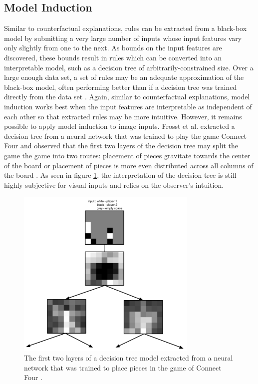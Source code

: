 \subsection{Model Induction}

Similar to counterfactual explanations, rules can be extracted from a black-box model by submitting a very large number of inputs whose input features vary only slightly from one to the next.  As bounds on the input features are discovered, these bounds result in rules which can be converted into an interpretable model, such as a decision tree of arbitrarily-constrained size.  Over a large enough data set, a set of rules may be an adequate approximation of the black-box model, often performing better than if a decision tree was trained directly from the data set \cite{Vandewiele2016GENESIMGE}.  Again, similar to counterfactual explanations, model induction works best when the input features are interpretable as independent of each other so that extracted rules may be more intuitive.  However, it remains possible to apply model induction to image inputs.  Frosst et al. extracted a decision tree from a neural network that was trained to play the game Connect Four \cite{Frosst2017DistillingAN} and observed that the first two layers of the decision tree may split the game the game into two routes: placement of pieces gravitate towards the center of the board or placement of pieces is more even distributed across all columns of the board \cite{Frosst2017DistillingAN}.  As seen in figure \ref{fig:frosst2017}, the interpretation of the decision tree is still highly subjective for visual inputs and relies on the observer's intuition.

\begin{figure}
    \centering
    \includegraphics[width=3.4in]{media/frosst2017.png}
    \caption{The first two layers of a decision tree model extracted from a neural network that was trained to place pieces in the game of Connect Four \cite{Frosst2017DistillingAN}.}
    \label{fig:frosst2017}
\end{figure}

